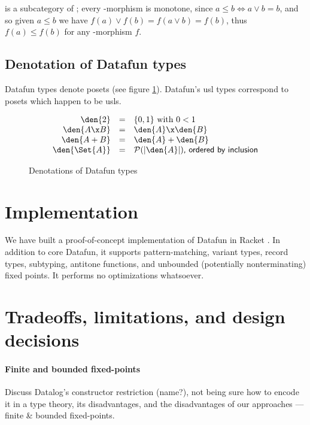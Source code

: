 \documentclass[preprint]{sigplanconf}
\begin{document}
 is a subcategory of ; every -morphism is monotone,
since $a \le b \iff a \vee b = b$, and so given $a \le b$ we have $f(a) \vee
f(b) = f(a \vee b) = f(b)$, thus $f(a) \le f(b)$ for any -morphism $f$.

\subsection{Denotation of Datafun types}
Datafun types denote posets (see figure \ref{fig:semtypes}). Datafun's usl types
correspond to posets which happen to be usls.

\newcommand{\powerset}{\mathcal{P}}

\begin{figure}
  \[\begin{array}{rcl}
  \den{2} &=& \{0,1\} ~\text{with}~ 0 < 1\\
  \den{A \x B} &=& \den{A} \x \den{B}\\
  \den{A + B} &=& \den{A} + \den{B}\\
  \den{\Set{A}} &=& \powerset(|\den{A}|)\textsf{, ordered by inclusion}
  \end{array}\]
  \label{fig:semtypes}
  \caption{Denotations of Datafun types}
\end{figure}



\section{Implementation}
We have built a proof-of-concept implementation of Datafun in Racket
. In addition to core Datafun, it supports pattern-matching, variant
types, record types, subtyping, antitone functions, and unbounded (potentially
nonterminating) fixed points. It performs no optimizations whatsoever.



\section{Tradeoffs, limitations, and design decisions}

\paragraph{Finite and bounded fixed-points} \TODO Discuss
Datalog's constructor restriction (name?), not being sure how to encode it in a
type theory, its disadvantages, and the disadvantages of our approaches ---
finite \& bounded fixed-points.
\end{document}
